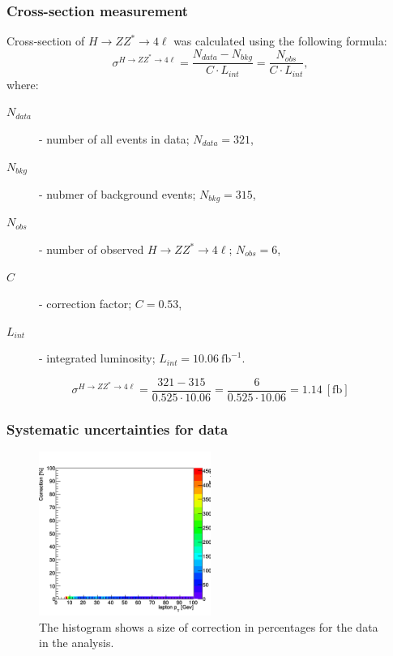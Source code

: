 \documentclass[aspectratio=1610, english]{beamer}
\newcommand{\hzz}{ H\rightarrow ZZ^{*}\rightarrow 4 \ell}
\begin{document}
\begin{frame}
\frametitle{Cross-section measurement}
Cross-section of $\hzz$ was calculated using the following formula:
\begin{equation}
\sigma^{\hzz}=\frac{N_{data}-N_{bkg}}{C\cdot L_{int}}=\frac{N_{obs}}{C\cdot L_{int}} ,
\end{equation}
where:
\begin{description}
\item[$N_{data}$] - number of all events in data; $N_{data}=321$,
\item[$N_{bkg}$] - nubmer of background events; $N_{bkg}=315$,
\item[$N_{obs}$] - number of observed $\hzz$; $N_{obs}=6$,
\item[$C$] - correction factor; $C=0.53$,
\item[$L_{int}$] - integrated luminosity; $L_{int}=10.06 \: \mathrm{fb}^{-1}$.
\end{description}
\vspace{1cm}
\begin{equation}
\sigma^{\hzz}=\frac{321-315}{0.525\cdot 10.06}=\frac{6}{0.525\cdot 10.06}=1.14 \: [\mathrm{fb}]
\end{equation}

\end{frame}

\begin{frame}
\frametitle{Systematic uncertainties for data}

\begin{figure} [H]
\centering
\includegraphics[width=0.5\textwidth]{syst1_data.png}
\caption{The histogram shows a size of correction in percentages for the data in the analysis. }
\end{figure}

\end{frame}
\end{document}
